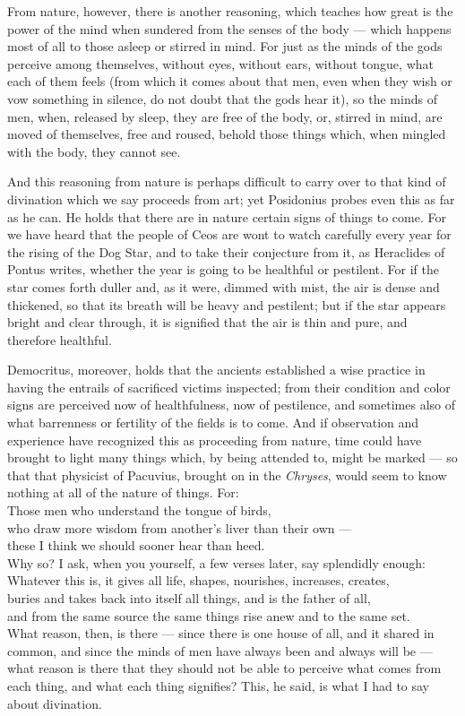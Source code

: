  From nature, however, there is another reasoning, which teaches how great is the power of the mind when sundered from the senses of the body — which happens most of all to those asleep or stirred in mind. For just as the minds of the gods perceive among themselves, without eyes, without ears, without tongue, what each of them feels (from which it comes about that men, even when they wish or vow something in silence, do not doubt that the gods hear it), so the minds of men, when, released by sleep, they are free of the body, or, stirred in mind, are moved of themselves, free and roused, behold those things which, when mingled with the body, they cannot see.

 And this reasoning from nature is perhaps difficult to carry over to that kind of divination which we say proceeds from art; yet Posidonius probes even this as far as he can. He holds that there are in nature certain signs of things to come. For we have heard that the people of Ceos are wont to watch carefully every year for the rising of the Dog Star, and to take their conjecture from it, as Heraclides of Pontus writes, whether the year is going to be healthful or pestilent. For if the star comes forth duller and, as it were, dimmed with mist, the air is dense and thickened, so that its breath will be heavy and pestilent; but if the star appears bright and clear through, it is signified that the air is thin and pure, and therefore healthful.

 Democritus, moreover, holds that the ancients established a wise practice in having the entrails of sacrificed victims inspected; from their condition and color signs are perceived now of healthfulness, now of pestilence, and sometimes also of what barrenness or fertility of the fields is to come. And if observation and experience have recognized this as proceeding from nature, time could have brought to light many things which, by being attended to, might be marked — so that that physicist of Pacuvius, brought on in the \textit{Chryses}, would seem to know nothing at all of the nature of things. For: \\
Those men who understand the tongue of birds, \\
who draw more wisdom from another's liver than their own — \\
these I think we should sooner hear than heed. \\
Why so? I ask, when you yourself, a few verses later, say splendidly enough: \\
Whatever this is, it gives all life, shapes, nourishes, increases, creates, \\
buries and takes back into itself all things, and is the father of all, \\
and from the same source the same things rise anew and to the same set. \\
What reason, then, is there — since there is one house of all, and it shared in common, and since the minds of men have always been and always will be — what reason is there that they should not be able to perceive what comes from each thing, and what each thing signifies? This, he said, is what I had to say about divination.

